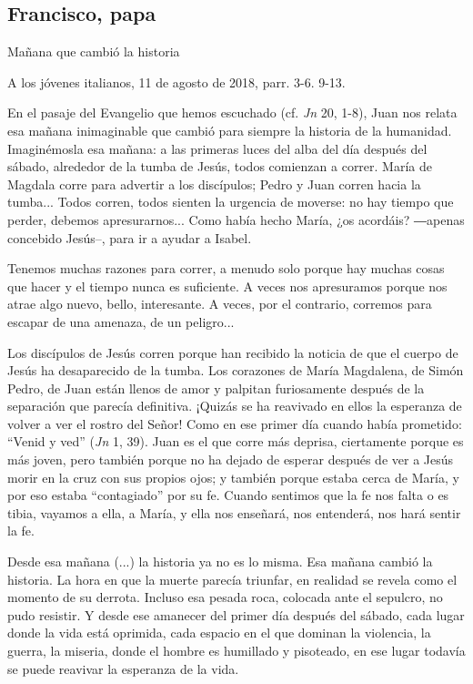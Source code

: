 			\subsection{Francisco, papa}
			
			\begin{patertheme}Mañana que cambió la historia\end{patertheme}
			
			\begin{patersource}A los jóvenes italianos, 11 de agosto de 2018, parr. 3-6. 9-13.\end{patersource}
			
			\begin{body}[...] En el pasaje del Evangelio que hemos escuchado (cf. \textit{Jn} 20, 1-8), Juan nos relata esa mañana inimaginable que cambió para siempre la historia de la humanidad. Imaginémosla esa mañana: a las primeras luces del alba del día después del sábado, alrededor de la tumba de Jesús, todos comienzan a correr. María de Magdala corre para advertir a los discípulos; Pedro y Juan corren hacia la tumba... Todos corren, todos sienten la urgencia de moverse: no hay tiempo que perder, debemos apresurarnos... Como había hecho María, ¿os acordáis? ―apenas concebido Jesús–, para ir a ayudar a Isabel.\end{body}
			
			Tenemos muchas razones para correr, a menudo solo porque hay muchas cosas que hacer y el tiempo nunca es suficiente. A veces nos apresuramos porque nos atrae algo nuevo, bello, interesante. A veces, por el contrario, corremos para escapar de una amenaza, de un peligro...
			
			Los discípulos de Jesús corren porque han recibido la noticia de que el cuerpo de Jesús ha desaparecido de la tumba. Los corazones de María Magdalena, de Simón Pedro, de Juan están llenos de amor y palpitan furiosamente después de la separación que parecía definitiva. ¡Quizás se ha reavivado en ellos la esperanza de volver a ver el rostro del Señor! Como en ese primer día cuando había prometido: “Venid y ved” (\textit{Jn} 1, 39). Juan es el que corre más deprisa, ciertamente porque es más joven, pero también porque no ha dejado de esperar después de ver a Jesús morir en la cruz con sus propios ojos; y también porque estaba cerca de María, y por eso estaba “contagiado” por su fe. Cuando sentimos que la fe nos falta o es tibia, vayamos a ella, a María, y ella nos enseñará, nos entenderá, nos hará sentir la fe.
			
			Desde esa mañana (...) la historia ya no es lo misma. Esa mañana cambió la historia. La hora en que la muerte parecía triunfar, en realidad se revela como el momento de su derrota. Incluso esa pesada roca, colocada ante el sepulcro, no pudo resistir. Y desde ese amanecer del primer día después del sábado, cada lugar donde la vida está oprimida, cada espacio en el que dominan la violencia, la guerra, la miseria, donde el hombre es humillado y pisoteado, en ese lugar todavía se puede reavivar la esperanza de la vida.
			
